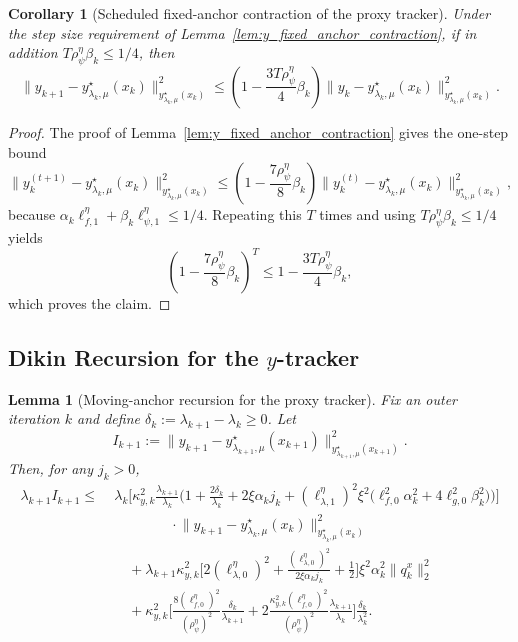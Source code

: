\documentclass{article}
\newtheorem{corollary}{Corollary}
\newtheorem{lemma}{Lemma}
\begin{document}
\begin{corollary}[Scheduled fixed-anchor contraction of the proxy tracker]
\label{cor:y_fixed_anchor_scheduled}
Under the step size requirement of Lemma~\ref{lem:y_fixed_anchor_contraction}, if in addition
\(T\rho_\psi^\eta\beta_k\le 1/4\), then
\[
\|y_{k+1}-y_{\lambda_k,\mu}^\star(x_k)\|_{y_{\lambda_k,\mu}^\star(x_k)}^2
\le
\left(1-\frac{3T\rho_\psi^\eta}{4}\beta_k\right)
\|y_k-y_{\lambda_k,\mu}^\star(x_k)\|_{y_{\lambda_k,\mu}^\star(x_k)}^2 .
\]
\end{corollary}

\begin{proof}
The proof of Lemma~\ref{lem:y_fixed_anchor_contraction} gives the one-step bound
\[
\|y_k^{(t+1)}-y_{\lambda_k,\mu}^\star(x_k)\|_{y_{\lambda_k,\mu}^\star(x_k)}^2
\le
\left(1-\frac{7\rho_\psi^\eta}{8}\beta_k\right)
\|y_k^{(t)}-y_{\lambda_k,\mu}^\star(x_k)\|_{y_{\lambda_k,\mu}^\star(x_k)}^2,
\]
because \(\alpha_k\ell_{f,1}^{\eta}+\beta_k\ell_{\psi,1}^{\eta}\le 1/4\). Repeating this \(T\) times
and using \(T\rho_\psi^\eta\beta_k\le 1/4\) yields
\[
\left(1-\frac{7\rho_\psi^\eta}{8}\beta_k\right)^T
\le
1-\frac{3T\rho_\psi^\eta}{4}\beta_k,
\]
which proves the claim.
\end{proof}


\subsection{Dikin Recursion for the \(y\)-tracker}

\begin{lemma}[Moving-anchor recursion for the proxy tracker]
\label{lem:y_moving_anchor_recursion}
Fix an outer iteration \(k\) and define
\(\delta_k:=\lambda_{k+1}-\lambda_k\ge 0\). Let
\[
I_{k+1}
:=
\big\|y_{k+1}-y_{\lambda_{k+1},\mu}^\star(x_{k+1})\big\|_{y_{\lambda_{k+1},\mu}^\star(x_{k+1})}^2 .
\]
Then, for any \(j_k>0\),
\begin{align}
\lambda_{k+1} I_{k+1}
\le\;&
\lambda_k
\Bigg[
\kappa_{y,k}^2
\frac{\lambda_{k+1}}{\lambda_k}
\Big(
1+\frac{2\delta_k}{\lambda_k}
+2\xi\alpha_k j_k
+(\ell_{\lambda,1}^\eta)^2\xi^2
\bigl(\ell_{f,0}^2\alpha_k^2+4\ell_{g,0}^2\beta_k^2\bigr)
\Big)
\Bigg]
\nonumber\\
&\qquad\qquad\cdot
\big\|y_{k+1}-y_{\lambda_k,\mu}^\star(x_k)\big\|_{y_{\lambda_k,\mu}^\star(x_k)}^2
\nonumber\\
&\quad
+\lambda_{k+1}\kappa_{y,k}^2
\Bigg[
2(\ell_{\lambda,0}^\eta)^2
+
\frac{(\ell_{\lambda,0}^\eta)^2}{2\xi\alpha_k j_k}
+
\frac12
\Bigg]
\xi^2\alpha_k^2\|q_k^x\|_2^2
\nonumber\\
&\quad
+\kappa_{y,k}^2
\Bigg[
\frac{8(\ell_{f,0}^\eta)^2}{(\rho_\psi^\eta)^2}
\frac{\delta_k}{\lambda_{k+1}}
+
2\frac{\kappa_{y,k}^2(\ell_{f,0}^\eta)^2}{(\rho_\psi^\eta)^2}
\frac{\lambda_{k+1}}{\lambda_k}
\Bigg]
\frac{\delta_k}{\lambda_k^2}.
\label{eq:proxy_moving_anchor_raw}
\end{align}
\end{lemma}
\end{document}
